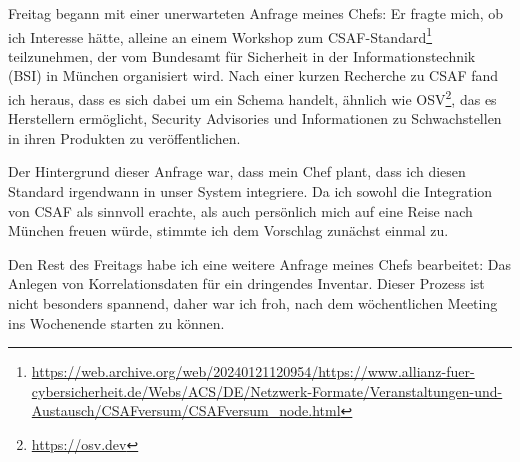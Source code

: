 Freitag begann mit einer unerwarteten Anfrage meines Chefs:
Er fragte mich, ob ich Interesse hätte, alleine an einem Workshop zum CSAF-Standard\footnote{\url{https://web.archive.org/web/20240121120954/https://www.allianz-fuer-cybersicherheit.de/Webs/ACS/DE/Netzwerk-Formate/Veranstaltungen-und-Austausch/CSAFversum/CSAFversum_node.html}} teilzunehmen, der vom Bundesamt für Sicherheit in der Informationstechnik (BSI) in München organisiert wird.
Nach einer kurzen Recherche zu CSAF fand ich heraus, dass es sich dabei um ein Schema handelt, ähnlich wie OSV\footnote{\url{https://osv.dev}}, das es Herstellern ermöglicht, Security Advisories und Informationen zu Schwachstellen in ihren Produkten zu veröffentlichen.

Der Hintergrund dieser Anfrage war, dass mein Chef plant, dass ich diesen Standard irgendwann in unser System integriere.
Da ich sowohl die Integration von CSAF als sinnvoll erachte, als auch persönlich mich auf eine Reise nach München freuen würde, stimmte ich dem Vorschlag zunächst einmal zu.

Den Rest des Freitags habe ich eine weitere Anfrage meines Chefs bearbeitet:
Das Anlegen von Korrelationsdaten für ein dringendes Inventar.
Dieser Prozess ist nicht besonders spannend, daher war ich froh, nach dem wöchentlichen Meeting ins Wochenende starten zu können.
